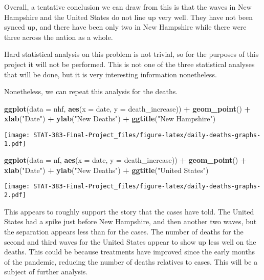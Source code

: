\documentclass[
]{article}
\newenvironment{Shaded}{\begin{snugshade}}{\end{snugshade}}
\newcommand{\DataTypeTok}[1]{\textcolor[rgb]{0.13,0.29,0.53}{#1}}
\newcommand{\KeywordTok}[1]{\textcolor[rgb]{0.13,0.29,0.53}{\textbf{#1}}}
\newcommand{\NormalTok}[1]{#1}
\newcommand{\OperatorTok}[1]{\textcolor[rgb]{0.81,0.36,0.00}{\textbf{#1}}}
\newcommand{\StringTok}[1]{\textcolor[rgb]{0.31,0.60,0.02}{#1}}
\begin{document}
Overall, a tentative conclusion we can draw from this is that the waves
in New Hampshire and the United States do not line up very well. They
have not been synced up, and there have been only two in New Hampshire
while there were three across the nation as a whole.

Hard statistical analysis on this problem is not trivial, so for the
purposes of this project it will not be performed. This is not one of
the three statistical analyses that will be done, but it is very
interesting information nonetheless.

Nonetheless, we can repeat this analysis for the deaths.

\begin{Shaded}
\begin{Highlighting}[]
\KeywordTok{ggplot}\NormalTok{(}\DataTypeTok{data =}\NormalTok{ nhf, }\KeywordTok{aes}\NormalTok{(}\DataTypeTok{x =}\NormalTok{ date, }\DataTypeTok{y =}\NormalTok{ death_increase)) }\OperatorTok{+}\StringTok{ }\KeywordTok{geom_point}\NormalTok{() }\OperatorTok{+}\StringTok{ }\KeywordTok{xlab}\NormalTok{(}\StringTok{"Date"}\NormalTok{) }\OperatorTok{+}\StringTok{ }\KeywordTok{ylab}\NormalTok{(}\StringTok{"New Deaths"}\NormalTok{) }\OperatorTok{+}\StringTok{ }\KeywordTok{ggtitle}\NormalTok{(}\StringTok{"New Hampshire"}\NormalTok{)}
\end{Highlighting}
\end{Shaded}

\texttt{[image: STAT-383-Final-Project\_files/figure-latex/daily-deaths-graphs-1.pdf]}

\begin{Shaded}
\begin{Highlighting}[]
\KeywordTok{ggplot}\NormalTok{(}\DataTypeTok{data =}\NormalTok{ nf, }\KeywordTok{aes}\NormalTok{(}\DataTypeTok{x =}\NormalTok{ date, }\DataTypeTok{y =}\NormalTok{ death_increase)) }\OperatorTok{+}\StringTok{ }\KeywordTok{geom_point}\NormalTok{() }\OperatorTok{+}\StringTok{ }\KeywordTok{xlab}\NormalTok{(}\StringTok{"Date"}\NormalTok{) }\OperatorTok{+}\StringTok{ }\KeywordTok{ylab}\NormalTok{(}\StringTok{"New Deaths"}\NormalTok{) }\OperatorTok{+}\StringTok{ }\KeywordTok{ggtitle}\NormalTok{(}\StringTok{"United States"}\NormalTok{)}
\end{Highlighting}
\end{Shaded}

\texttt{[image: STAT-383-Final-Project\_files/figure-latex/daily-deaths-graphs-2.pdf]}

This appears to roughly support the story that the cases have told. The
United States had a spike just before New Hampshire, and then another
two waves, but the separation appears less than for the cases. The
number of deaths for the second and third waves for the United States
appear to show up less well on the deaths. This could be because
treatments have improved since the early months of the pandemic,
reducing the number of deaths relatives to cases. This will be a subject
of further analysis.
\end{document}
